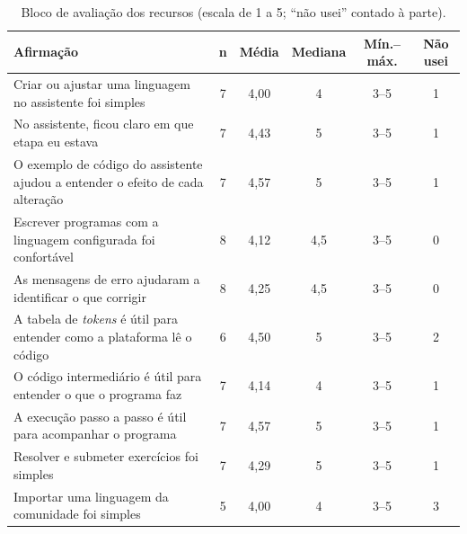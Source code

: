 \begin{table}[htbp]
\centering
\caption{Bloco de avaliação dos recursos (escala de 1 a 5; ``não usei'' contado à parte).}
\label{tab:ap-recursos}
\footnotesize
\renewcommand{\arraystretch}{1.2}
\begin{tabular}{|p{7.9cm}|c|c|c|c|c|}
\hline
\textbf{Afirmação} & \textbf{n} & \textbf{Média} & \textbf{Mediana} & \textbf{Mín.--máx.} & \textbf{Não usei} \\\hline
Criar ou ajustar uma linguagem no assistente foi simples & 7 & 4,00 & 4 & 3--5 & 1 \\\hline
No assistente, ficou claro em que etapa eu estava & 7 & 4,43 & 5 & 3--5 & 1 \\\hline
O exemplo de código do assistente ajudou a entender o efeito de cada alteração & 7 & 4,57 & 5 & 3--5 & 1 \\\hline
Escrever programas com a linguagem configurada foi confortável & 8 & 4,12 & 4,5 & 3--5 & 0 \\\hline
As mensagens de erro ajudaram a identificar o que corrigir & 8 & 4,25 & 4,5 & 3--5 & 0 \\\hline
A tabela de \textit{tokens} é útil para entender como a plataforma lê o código & 6 & 4,50 & 5 & 3--5 & 2 \\\hline
O código intermediário é útil para entender o que o programa faz & 7 & 4,14 & 4 & 3--5 & 1 \\\hline
A execução passo a passo é útil para acompanhar o programa & 7 & 4,57 & 5 & 3--5 & 1 \\\hline
Resolver e submeter exercícios foi simples & 7 & 4,29 & 5 & 3--5 & 1 \\\hline
Importar uma linguagem da comunidade foi simples & 5 & 4,00 & 4 & 3--5 & 3 \\\hline
\end{tabular}
\end{table}

